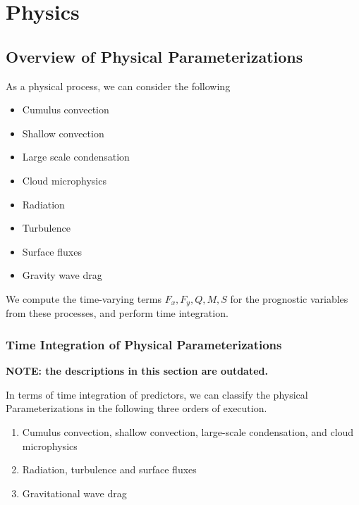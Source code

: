 \hypertarget{physics}{%
\section{Physics}\label{physics}}

\hypertarget{overview-of-physical-parameterizations}{%
\subsection{Overview of Physical Parameterizations}\label{overview-of-physical-parameterizations}}

As a physical process, we can consider the following

\begin{itemize}
\tightlist
\item
  Cumulus convection
\item
  Shallow convection
\item
  Large scale condensation
\item
  Cloud microphysics
\item
  Radiation
\item
  Turbulence
\item
  Surface fluxes
\item
  Gravity wave drag
\end{itemize}

We compute the time-varying terms \(F_x, F_y, Q, M, S\) for the prognostic variables from these processes, and perform time integration.

\hypertarget{time-integration-of-physical-parameterizations}{%
\subsubsection{Time Integration of Physical Parameterizations}\label{time-integration-of-physical-parameterizations}}

\textbf{NOTE: the descriptions in this section are outdated.}

In terms of time integration of predictors, we can classify the physical Parameterizations in the following three orders of execution.

\begin{enumerate}
\def\labelenumi{\arabic{enumi}.}
\item
  Cumulus convection, shallow convection, large-scale condensation, and cloud microphysics
\item
  Radiation, turbulence and surface fluxes
\item
  Gravitational wave drag
\end{enumerate}


